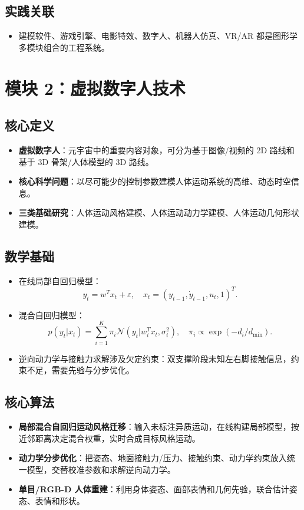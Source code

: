 \documentclass[UTF8,zihao=-4,scheme=chinese,fontset=fandol]{ctexart}
\newcommand{\key}[1]{\textbf{#1}}
\begin{document}
\subsection{实践关联}
\begin{itemize}
  \item 建模软件、游戏引擎、电影特效、数字人、机器人仿真、VR/AR 都是图形学多模块组合的工程系统。
\end{itemize}

\section{模块 2：虚拟数字人技术}

\subsection{核心定义}
\begin{itemize}
  \item \key{虚拟数字人}：元宇宙中的重要内容对象，可分为基于图像/视频的 2D 路线和基于 3D 骨架/人体模型的 3D 路线。
  \item \key{核心科学问题}：以尽可能少的控制参数建模人体运动系统的高维、动态时空信息。
  \item \key{三类基础研究}：人体运动风格建模、人体运动动力学建模、人体运动几何形状建模。
\end{itemize}

\subsection{数学基础}
\begin{itemize}
  \item 在线局部自回归模型：
  \[
  y_t=w^Tx_t+\varepsilon,\quad x_t=(y_{t-1},\dot y_{t-1},u_t,1)^T.
  \]
  \item 混合自回归模型：
  \[
  p(y_t|x_t)=\sum_{i=1}^K\pi_i\mathcal N(y_t|w_i^Tx_t,\sigma_i^2),\quad
  \pi_i\propto \exp(-d_i/d_{\min}).
  \]
  \item 逆向动力学与接触力求解涉及欠定约束：双支撑阶段未知左右脚接触信息，约束不足，需要先验与分步优化。
\end{itemize}

\subsection{核心算法}
\begin{itemize}
  \item \key{局部混合自回归运动风格迁移}：输入未标注异质运动，在线构建局部模型，按近邻距离决定混合权重，实时合成目标风格运动。
  \item \key{动力学分步优化}：把姿态、地面接触力/压力、接触约束、动力学约束放入统一模型，交替校准参数和求解逆向动力学。
  \item \key{单目/RGB-D 人体重建}：利用身体姿态、面部表情和几何先验，联合估计姿态、表情和形状。
\end{itemize}
\end{document}
